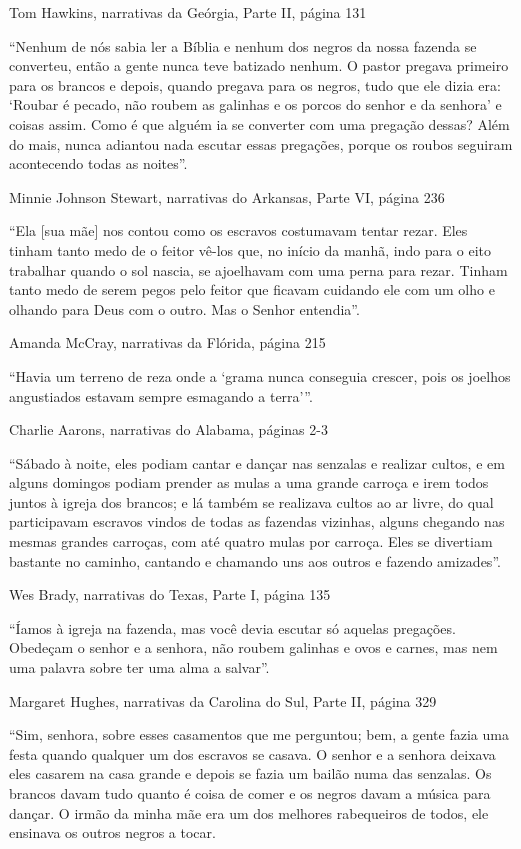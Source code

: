 Tom Hawkins, narrativas da Geórgia, Parte II, página 131

``Nenhum de nós sabia ler a Bíblia e nenhum dos negros da nossa fazenda
se converteu, então a gente nunca teve batizado nenhum. O pastor pregava
primeiro para os brancos e depois, quando pregava para os negros, tudo
que ele dizia era: `Roubar é pecado, não roubem as galinhas e os porcos
do senhor e da senhora' e coisas assim. Como é que alguém ia se
converter com uma pregação dessas? Além do mais, nunca adiantou nada
escutar essas pregações, porque os roubos seguiram acontecendo todas as
noites''.

Minnie Johnson Stewart, narrativas do Arkansas, Parte VI, página 236

``Ela {[}sua mãe{]} nos contou como os escravos costumavam tentar rezar.
Eles tinham tanto medo de o feitor vê-los que, no início da manhã, indo
para o eito trabalhar quando o sol nascia, se ajoelhavam com uma perna
para rezar. Tinham tanto medo de serem pegos pelo feitor que ficavam
cuidando ele com um olho e olhando para Deus com o outro. Mas o Senhor
entendia''.

Amanda McCray, narrativas da Flórida, página 215

``Havia um terreno de reza onde a `grama nunca conseguia crescer, pois
os joelhos angustiados estavam sempre esmagando a terra'''.

Charlie Aarons, narrativas do Alabama, páginas 2-3

``Sábado à noite, eles podiam cantar e dançar nas senzalas e realizar
cultos, e em alguns domingos podiam prender as mulas a uma grande
carroça e irem todos juntos à igreja dos brancos; e lá também se
realizava cultos ao ar livre, do qual participavam escravos vindos de
todas as fazendas vizinhas, alguns chegando nas mesmas grandes carroças,
com até quatro mulas por carroça. Eles se divertiam bastante no caminho,
cantando e chamando uns aos outros e fazendo amizades''.

Wes Brady, narrativas do Texas, Parte I, página 135

``Íamos à igreja na fazenda, mas você devia escutar só aquelas
pregações. Obedeçam o senhor e a senhora, não roubem galinhas e ovos e
carnes, mas nem uma palavra sobre ter uma alma a salvar''.

Margaret Hughes, narrativas da Carolina do Sul, Parte II, página 329

``Sim, senhora, sobre esses casamentos que me perguntou; bem, a gente
fazia uma festa quando qualquer um dos escravos se casava. O senhor e a
senhora deixava eles casarem na casa grande e depois se fazia um bailão
numa das senzalas. Os brancos davam tudo quanto é coisa de comer e os
negros davam a música para dançar. O irmão da minha mãe era um dos
melhores rabequeiros de todos, ele ensinava os outros negros a tocar.

